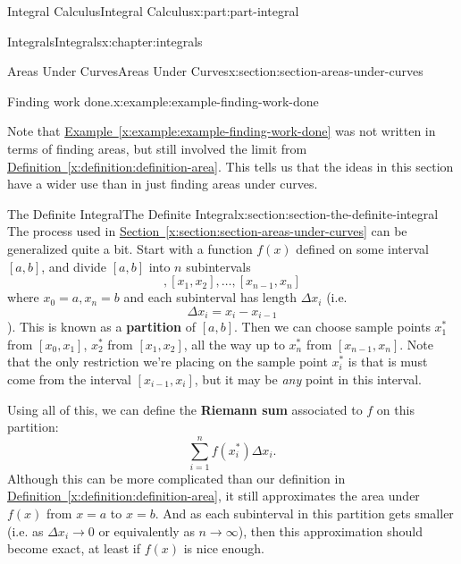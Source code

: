 \documentclass[twoside,10pt,]{book}
\newcommand{\xreffont}{\relax}
\newcommand{\terminology}[1]{\textbf{#1}}
\numberwithin{equation}{part}
\begin{document}
\begin{partptx}{Integral Calculus}{}{Integral Calculus}{}{}{x:part:part-integral}
\begin{chapterptx}{Integrals}{}{Integrals}{}{}{x:chapter:integrals}
\begin{sectionptx}{Areas Under Curves}{}{Areas Under Curves}{}{}{x:section:section-areas-under-curves}
\begin{example}{Finding work done.}{x:example:example-finding-work-done}
\begin{equation*}
\end{equation*}
%
\end{example}
Note that \hyperref[x:example:example-finding-work-done]{Example~{\xreffont\ref{x:example:example-finding-work-done}}} was not written in terms of finding areas, but still involved the limit from \hyperref[x:definition:definition-area]{Definition~{\xreffont\ref{x:definition:definition-area}}}. This tells us that the ideas in this section have a wider use than in just finding areas under curves.%
\end{sectionptx}
%
%
\typeout{************************************************}
\typeout{************************************************}
%
\begin{sectionptx}{The Definite Integral}{}{The Definite Integral}{}{}{x:section:section-the-definite-integral}
The process used in \hyperref[x:section:section-areas-under-curves]{Section~{\xreffont\ref{x:section:section-areas-under-curves}}} can be generalized quite a bit. Start with a function \(f(x)\) defined on some interval \([a,b]\), and divide \([a,b]\) into \(n\) subintervals%
\begin{equation*}
[x_{0},x_{1}], [x_{1},x_{2}],\ldots,[x_{n-1},x_{n}]
\end{equation*}
where \(x_{0} = a, x_{n} = b\) and each subinterval has length \(\Delta x_{i}\) (i.e.%
\begin{equation*}
\Delta x_{i} = x_{i} - x_{i-1}
\end{equation*}
). This is known as a \terminology{partition} of \([a,b]\). Then we can choose sample points \(x_{1}^{*}\) from \([x_{0},x_{1}]\), \(x_{2}^{*}\) from \([x_{1},x_{2}]\), all the way up to \(x_{n}^{*}\) from \([x_{n-1},x_{n}]\). Note that the only restriction we're placing on the sample point \(x_{i}^{*}\) is that is must come from the interval \([x_{i-1},x_{i}]\), but it may be \emph{any} point in this interval.%
\par
Using all of this, we can define the \terminology{Riemann sum} associated to \(f\) on this partition:%
\begin{equation*}
\sum_{i=1}^{n}f(x_{i}^{*})\Delta x_{i}.
\end{equation*}
Although this can be more complicated than our definition in \hyperref[x:definition:definition-area]{Definition~{\xreffont\ref{x:definition:definition-area}}}, it still approximates the area under \(f(x)\) from \(x=a\) to \(x=b\). And as each subinterval in this partition gets smaller (i.e. as \(\Delta x_{i}\to0\) or equivalently as \(n\to\infty\)), then this approximation should become exact, at least if \(f(x)\) is nice enough.%

\end{sectionptx}
\end{chapterptx}
\end{partptx}
\end{document}
